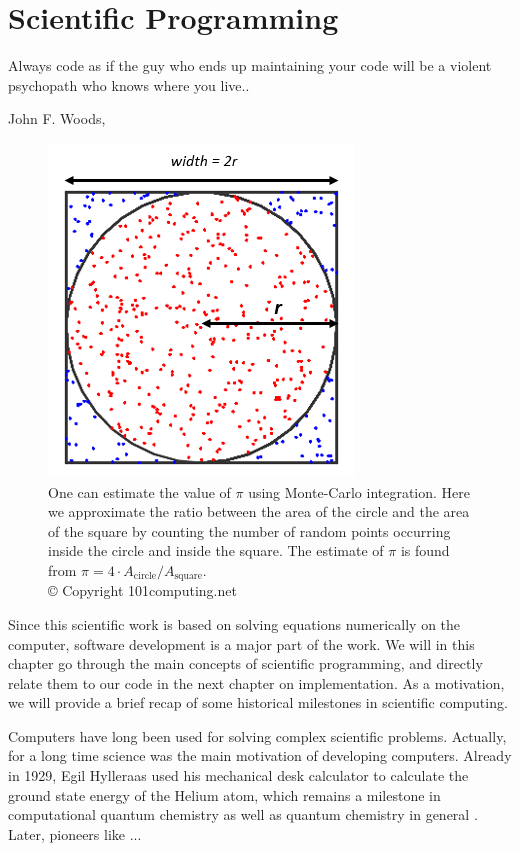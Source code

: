 \chapter{Scientific Programming} \label{chp:scientificprogramming}
\epigraph{Always code as if the guy who ends up maintaining your code will be a violent psychopath who knows where you live..}{John F. Woods, \cite{woods_usage_nodate}}
\begin{figure}[H]
	\centering
	\includegraphics[scale=0.9]{Images/montecarlointegration.png}
	\caption{One can estimate the value of $\pi$ using Monte-Carlo integration. Here we approximate the ratio between the area of the circle and the area of the square by counting the number of random points occurring inside the circle and inside the square. The estimate of $\pi$ is found from $\pi=4\cdot A_{\text{circle}}/A_{\text{square}}$.\\ © Copyright 101computing.net}
	\label{fig:montecarlointegration}
\end{figure}

Since this scientific work is based on solving equations numerically on the computer, software development is a major part of the work. We will in this chapter go through the main concepts of scientific programming, and directly relate them to our code in the next chapter on implementation. As a motivation, we will provide a brief recap of some historical milestones in scientific computing.

Computers have long been used for solving complex scientific problems. Actually, for a long time science was the main motivation of developing computers. Already in 1929, Egil Hylleraas used his mechanical desk calculator to calculate the ground state energy of the Helium atom, which remains a milestone in computational quantum chemistry as well as quantum chemistry in general \cite{helgaker_perspective_2000}. Later, pioneers like ...

